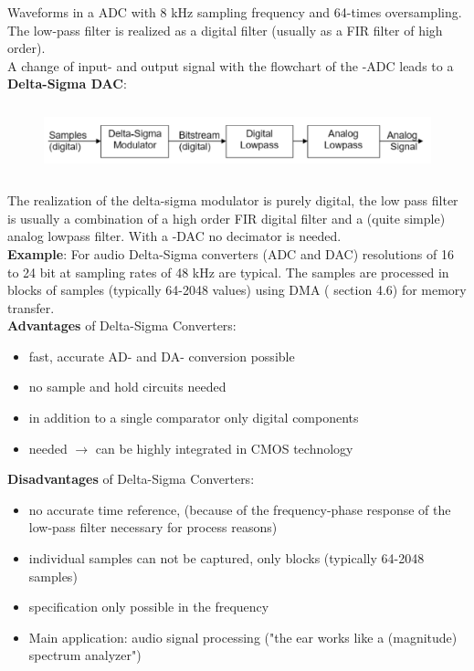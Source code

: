 Waveforms in a ADC with 8 kHz sampling frequency and 64-times oversampling. The low-pass filter is realized as a digital filter (usually as a FIR filter of high order). \\

A change of input- and output signal with the flowchart of the -ADC leads to a \\

{\rot\bf Delta-Sigma DAC}:\\

    \begin{figure}[h]
    \centering
    \includegraphics[width=14cm, height=2cm]{Images/image180.png}
    \label{fig:Fig 139}
    \end{figure}

The realization of the delta-sigma modulator is purely digital, the low pass filter is usually a combination of a high order FIR digital filter and a (quite simple) analog lowpass filter. With a -DAC no decimator is needed.\\

\textbf{Example}: For audio Delta-Sigma converters (ADC and DAC) resolutions of 16 to 24 bit at  sampling rates of 48 kHz are typical. The samples are processed in blocks of samples (typically 64-2048 values) using DMA ( section  4.6) for memory transfer.\\

\textbf{Advantages } of Delta-Sigma Converters:

\begin{itemize}
\item  fast, accurate AD- and DA- conversion possible
\item  no sample and hold circuits needed
\item  in addition to a single comparator only digital components
\item needed $\rightarrow$ can be highly integrated in CMOS technology
\end{itemize}

\textbf{Disadvantages } of Delta-Sigma Converters:

\begin{itemize}
\item  no accurate time reference, (because of the frequency-phase response of the low-pass filter necessary for process reasons)
\item  individual samples can not be captured, only blocks (typically 64-2048 samples)
\item  specification only possible in the frequency
\item  Main application: audio signal processing ("the ear works like a (magnitude) spectrum analyzer")
\end{itemize}
\newpage
